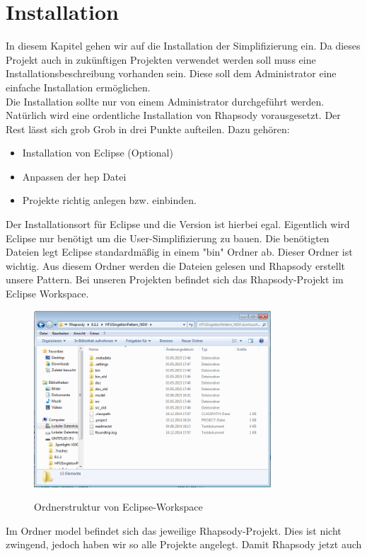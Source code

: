 \chapter{Installation}
In diesem Kapitel gehen wir auf die Installation der Simplifizierung ein. Da
dieses Projekt auch in zukünftigen Projekten verwendet werden soll muss eine
Installationsbeschreibung vorhanden sein. Diese soll dem Administrator eine
einfache Installation ermöglichen.\\
Die Installation sollte nur von einem Administrator durchgeführt werden.
Natürlich wird eine ordentliche Installation von Rhapsody vorausgesetzt. Der
Rest lässt sich grob Grob in drei Punkte aufteilen.
Dazu gehören:
\begin{itemize}
  \item Installation von Eclipse (Optional)
  \item Anpassen der hep Datei
  \item Projekte richtig anlegen bzw. einbinden.
\end{itemize}
Der Installationsort für Eclipse und die Version ist hierbei egal. Eigentlich
wird Eclipse nur benötigt um die User-Simplifizierung zu bauen. Die benötigten
Dateien legt Eclipse standardmäßig in einem "bin" Ordner ab. Dieser Ordner ist
wichtig. Aus diesem Ordner werden die Dateien gelesen und Rhapsody erstellt
unsere Pattern. Bei unseren Projekten befindet sich das Rhapsody-Projekt im
Eclipse Workspace.
\begin{figure}[!htbp]
	\centering
	\includegraphics[width=0.79\textwidth]{content/pictures/install/struktur.png}
	\label{pic:bild}
	\caption{Ordnerstruktur von Eclipse-Workspace}
\end{figure}
Im Ordner model befindet sich das jeweilige Rhapsody-Projekt. Dies ist nicht
zwingend, jedoch haben wir so alle Projekte angelegt. Damit Rhapsody jetzt auch
